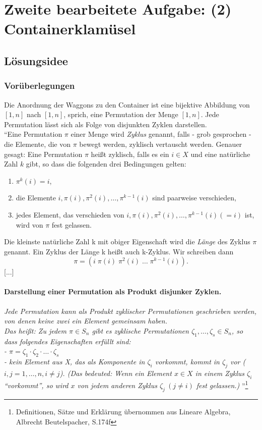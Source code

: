 \section{Zweite bearbeitete Aufgabe: (2) Containerklamüsel}
\subsection{Lösungsidee}
\subsubsection{Vorüberlegungen}
Die Anordnung der Waggons zu den Container ist eine bijektive Abbildung von $[1,n]$ nach $[1,n]$, sprich, eine Permutation der Menge $[1,n]$.
Jede Permutation lässt sich als Folge von disjunkten Zyklen darstellen. \\ %
``Eine Permutation $\pi$ einer Menge wird \emph{Zyklus} genannt, falls - grob gesprochen - die Elemente, die von $\pi$ bewegt werden,
zyklisch vertauscht werden. Genauer gesagt: Eine Permutation $\pi$ heißt zyklisch,
falls es ein $ i \in X$ und eine natürliche Zahl $k$ gibt, so dass die folgenden drei Bedingungen gelten:
\begin{enumerate}
 \item $\pi^k(i) = i$,
 \item die Elemente $i,\pi(i),\pi^2(i),\dots,\pi^{k-1}(i)$ sind paarweise verschieden,
 \item jedes Element, das verschieden von $i,\pi(i),\pi^2(i),\dots,\pi^{k-1}(i) (=i)$ ist, wird von $\pi$ fest gelassen.
\end{enumerate}
Die kleinste natürliche Zahl k mit obiger Eigenschaft wird die \emph{Länge} des Zyklus $\pi$ genannt.
Ein Zyklus der Länge k heißt auch k-Zyklus. Wir schreiben dann \[\pi=(i\;\pi(i)\;\pi^2(i) \; \dots \;\pi^{k-1}(i)).\]
[...]
\paragraph{Darstellung einer Permutation als Produkt disjunker Zyklen.}
\emph{Jede Permutation kann als Produkt zyklischer Permutationen geschrieben werden, von denen keine zwei ein Element gemeinsam haben.}\\
\emph{Das heißt: Zu jedem $\pi \in S_n$ gibt es zyklische Permutationen $\zeta_1,\dots,\zeta_s \in S_n$,
so dass folgendes Eigenschaften erfüllt sind: \\
 - $\pi=\zeta_1\cdot \zeta_2 \cdot \ldots \cdot \zeta_s$ \\
 - kein Element aus X, das als Komponente in $\zeta_i$ vorkommt, kommt in $\zeta_j$ vor ($i,j=1,\dots,n, i \neq j$).
(Das bedeuted: Wenn ein Element $x \in X$ in einem Zyklus $\zeta_i$ ``vorkommt'',
 so wird $x$ von jedem anderen Zyklus $\zeta_j \: (j \neq i)$ fest gelassen.)
}''\footnote{Definitionen, Sätze und Erklärung übernommen aus Lineare Algebra, Albrecht Beutelspacher, S.174f}\\

